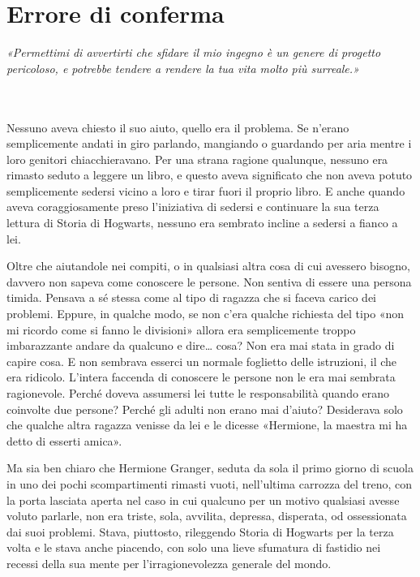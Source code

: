 
\chapter{Errore di conferma}
\label{capitolo:8}

\emph{«Permettimi di avvertirti che sfidare il mio ingegno è un genere di progetto pericoloso, e potrebbe tendere a rendere la tua vita molto più surreale.»}

~\\
~\\



Nessuno aveva chiesto il suo aiuto, quello era il problema. Se n’erano semplicemente andati in giro parlando, mangiando o guardando per aria mentre i loro genitori chiacchieravano. Per una strana ragione qualunque, nessuno era rimasto seduto a leggere un libro, e questo aveva significato che non aveva potuto semplicemente sedersi vicino a loro e tirar fuori il proprio libro. E anche quando aveva coraggiosamente preso l’iniziativa di sedersi e continuare la sua terza lettura di Storia di Hogwarts, nessuno era sembrato incline a sedersi a fianco a lei.

Oltre che aiutandole nei compiti, o in qualsiasi altra cosa di cui avessero bisogno, davvero non sapeva come conoscere le persone. Non sentiva di essere una persona timida. Pensava a sé stessa come al tipo di ragazza che si faceva carico dei problemi. Eppure, in qualche modo, se non c’era qualche richiesta del tipo «non mi ricordo come si fanno le divisioni» allora era semplicemente troppo imbarazzante andare da qualcuno e dire… cosa? Non era mai stata in grado di capire cosa. E non sembrava esserci un normale foglietto delle istruzioni, il che era ridicolo. L’intera faccenda di conoscere le persone non le era mai sembrata ragionevole. Perché doveva assumersi lei tutte le responsabilità quando erano coinvolte due persone? Perché gli adulti non erano mai d’aiuto? Desiderava solo che qualche altra ragazza venisse da lei e le dicesse «Hermione, la maestra mi ha detto di esserti amica».

Ma sia ben chiaro che Hermione Granger, seduta da sola il primo giorno di scuola in uno dei pochi scompartimenti rimasti vuoti, nell’ultima carrozza del treno, con la porta lasciata aperta nel caso in cui qualcuno per un motivo qualsiasi avesse voluto parlarle, non era triste, sola, avvilita, depressa, disperata, od ossessionata dai suoi problemi. Stava, piuttosto, rileggendo Storia di Hogwarts per la terza volta e le stava anche piacendo, con solo una lieve sfumatura di fastidio nei recessi della sua mente per l’irragionevolezza generale del mondo.

